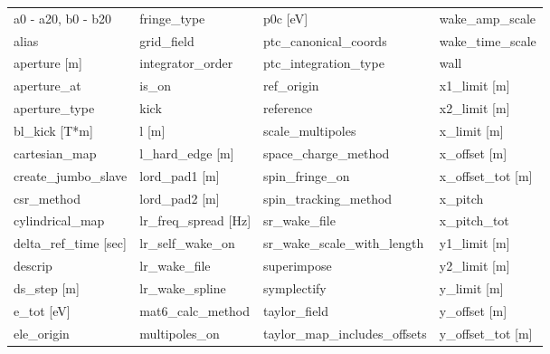  \begin{tabular}{llll} \toprule
a0 - a20, b0 - b20             & fringe_type                    & p0c [eV]                       & wake_amp_scale                 \\
alias                          & grid_field                     & ptc_canonical_coords           & wake_time_scale                \\
aperture [m]                   & integrator_order               & ptc_integration_type           & wall                           \\
aperture_at                    & is_on                          & ref_origin                     & x1_limit [m]                   \\
aperture_type                  & kick                           & reference                      & x2_limit [m]                   \\
bl_kick [T*m]                  & l [m]                          & scale_multipoles               & x_limit [m]                    \\
cartesian_map                  & l_hard_edge [m]                & space_charge_method            & x_offset [m]                   \\
create_jumbo_slave             & lord_pad1 [m]                  & spin_fringe_on                 & x_offset_tot [m]               \\
csr_method                     & lord_pad2 [m]                  & spin_tracking_method           & x_pitch                        \\
cylindrical_map                & lr_freq_spread [Hz]            & sr_wake_file                   & x_pitch_tot                    \\
delta_ref_time [sec]           & lr_self_wake_on                & sr_wake_scale_with_length      & y1_limit [m]                   \\
descrip                        & lr_wake_file                   & superimpose                    & y2_limit [m]                   \\
ds_step [m]                    & lr_wake_spline                 & symplectify                    & y_limit [m]                    \\
e_tot [eV]                     & mat6_calc_method               & taylor_field                   & y_offset [m]                   \\
ele_origin                     & multipoles_on                  & taylor_map_includes_offsets    & y_offset_tot [m]               \\

\end{tabular}
